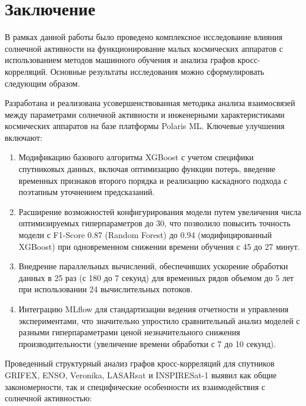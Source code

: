 \titleformat{\section}[block]{\large\bfseries\filcenter}{}{0em}{}
\chapter*{Заключение}

В рамках данной работы было проведено комплексное исследование влияния солнечной
активности на функционирование малых космических аппаратов с использованием
методов машинного обучения и анализа графов кросс-корреляций. Основные
результаты исследования можно сформулировать следующим образом.

Разработана и реализована усовершенствованная методика анализа взаимосвязей
между параметрами солнечной активности и инженерными характеристиками
космических аппаратов на базе платформы Polaris ML. Ключевые улучшения включают:

\begin{enumerate}
	\item Модификацию базового алгоритма XGBoost с учетом специфики спутниковых данных, включая оптимизацию функции потерь, введение временных признаков второго порядка и реализацию каскадного подхода с поэтапным уточнением предсказаний.

	\item Расширение возможностей конфигурирования модели путем увеличения числа оптимизируемых гиперпараметров до 30, что позволило повысить точность модели с F1-Score 0.87 (Random Forest) до 0.94 (модифицированный XGBoost) при одновременном снижении времени обучения с 45 до 27 минут.

	\item Внедрение параллельных вычислений, обеспечивших ускорение обработки данных в 25 раз (с 180 до 7 секунд) для временных рядов объемом до 5 лет при использовании 24 вычислительных потоков.

	\item Интеграцию MLflow для стандартизации ведения отчетности и управления экспериментами, что значительно упростило сравнительный анализ моделей с разными гиперпараметрами ценой незначительного снижения производительности (увеличение времени обработки с 7 до 10 секунд).
\end{enumerate}

Проведенный структурный анализ графов кросс-корреляций для спутников GRIFEX,
ENSO, Veronika, LASARsat и INSPIRESat-1 выявил как общие закономерности, так и
специфические особенности их взаимодействия с солнечной активностью:

